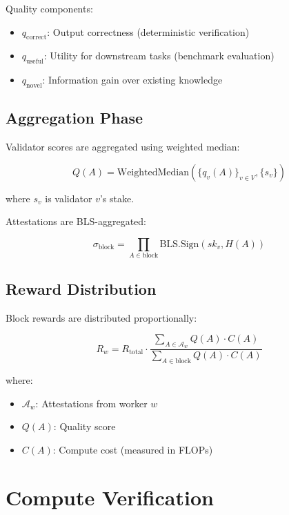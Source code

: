 \documentclass[11pt,letterpaper]{article}
\begin{document}
Quality components:
\begin{itemize}
    \item $q_{\text{correct}}$: Output correctness (deterministic verification)
    \item $q_{\text{useful}}$: Utility for downstream tasks (benchmark evaluation)
    \item $q_{\text{novel}}$: Information gain over existing knowledge
\end{itemize}

\subsection{Aggregation Phase}

Validator scores are aggregated using weighted median:

\begin{equation}
Q(A) = \text{WeightedMedian}(\{q_v(A)\}_{v \in V}, \{s_v\})
\end{equation}

where $s_v$ is validator $v$'s stake.

Attestations are BLS-aggregated:

\begin{equation}
\sigma_{\text{block}} = \prod_{A \in \text{block}} \text{BLS.Sign}(sk_v, H(A))
\end{equation}

\subsection{Reward Distribution}

Block rewards are distributed proportionally:

\begin{equation}
R_w = R_{\text{total}} \cdot \frac{\sum_{A \in \mathcal{A}_w} Q(A) \cdot C(A)}{\sum_{A \in \text{block}} Q(A) \cdot C(A)}
\end{equation}

where:
\begin{itemize}
    \item $\mathcal{A}_w$: Attestations from worker $w$
    \item $Q(A)$: Quality score
    \item $C(A)$: Compute cost (measured in FLOPs)
\end{itemize}

\section{Compute Verification}
\label{sec:verification}
\end{document}
